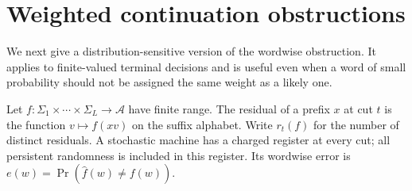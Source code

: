 \section{Weighted continuation obstructions}
\label{sec:v20-weighted}
We next give a distribution-sensitive version of the wordwise obstruction.
It applies to finite-valued terminal decisions and is useful even when a
word of small probability should not be assigned the same weight as a
likely one.

Let $f:\Sigma_1\times\cdots\times\Sigma_L\to\mathcal A$ have finite
range. The residual of a prefix $x$ at cut $t$ is the function
$v\mapsto f(xv)$ on the suffix alphabet. Write $r_t(f)$ for the number
of distinct residuals. A stochastic machine has a charged register at
every cut; all persistent randomness is included in this register.
Its wordwise error is $e(w)=\Pr(\widehat f(w)\ne f(w))$.

